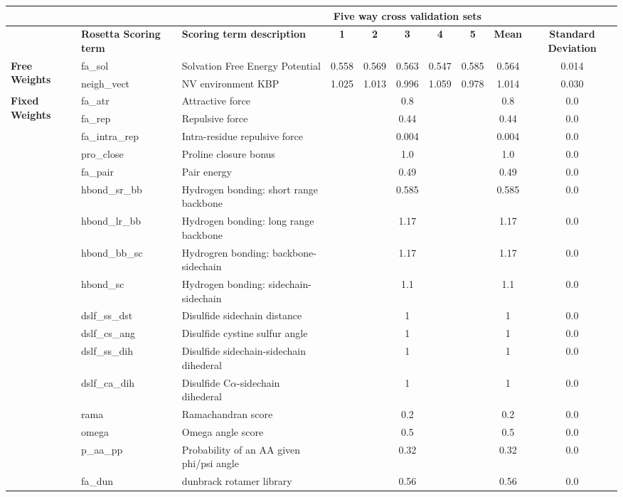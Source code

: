 
\begin{tabularx}{\textwidth}{|l||l|X|c|c|c|c|c|c|c|}
\hline
& & & \multicolumn{5}{c|}{\textbf{Five way cross validation sets}} & &  \\
\hline
& \textbf{Rosetta Scoring term} & \textbf{Scoring term description} & \textbf{1} & \textbf{2} & \textbf{3} & \textbf{4} & \textbf{5} & \textbf{Mean} & \textbf{Standard Deviation} \\
\hline
\hline
\multirow{2}{*}{\textbf{Free Weights}} & fa\_sol & Solvation Free Energy Potential & 0.558 & 0.569 & 0.563 & 0.547 & 0.585 & 0.564 & 0.014 \\
\cline{2-10}
& neigh\_vect & NV environment KBP & 1.025 & 1.013 & 0.996 & 1.059 & 0.978 & 1.014 & 0.030 \\
\hline
\multirow{17}{*}{\textbf{Fixed Weights}} & fa\_atr & Attractive force & \multicolumn{5}{c|}{0.8} & 0.8 & 0.0\\
\cline{2-10}
& fa\_rep & Repulsive force & \multicolumn{5}{c|}{0.44} & 0.44 & 0.0\\
\cline{2-10}
& fa\_intra\_rep & Intra-residue repulsive force & \multicolumn{5}{c|}{0.004} & 0.004 & 0.0\\
\cline{2-10}
& pro\_close & Proline closure bonus & \multicolumn{5}{c|}{1.0} & 1.0 & 0.0\\
\cline{2-10}
& fa\_pair & Pair energy & \multicolumn{5}{c|}{0.49} & 0.49 & 0.0\\
\cline{2-10}
& hbond\_sr\_bb & Hydrogen bonding: short range backbone & \multicolumn{5}{c|}{0.585} & 0.585 & 0.0\\
\cline{2-10}
& hbond\_lr\_bb & Hydrogen bonding: long range backbone & \multicolumn{5}{c|}{1.17} & 1.17 & 0.0\\
\cline{2-10}
& hbond\_bb\_sc & Hydrogren bonding: backbone-sidechain & \multicolumn{5}{c|}{1.17} & 1.17 & 0.0\\
\cline{2-10}
& hbond\_sc & Hydrogen bonding: sidechain-sidechain & \multicolumn{5}{c|}{1.1} & 1.1 & 0.0 \\
\cline{2-10}
& dslf\_ss\_dst & Disulfide sidechain distance & \multicolumn{5}{c|}{1} & 1 & 0.0\\
\cline{2-10}
& dslf\_cs\_ang & Disulfide cystine sulfur angle & \multicolumn{5}{c|}{1} & 1 & 0.0\\
\cline{2-10}
& dslf\_ss\_dih & Disulfide sidechain-sidechain dihederal & \multicolumn{5}{c|}{1} & 1 & 0.0\\
\cline{2-10}
& dslf\_ca\_dih & Disulfide C$\alpha$-sidechain dihederal & \multicolumn{5}{c|}{1} & 1 & 0.0\\
\cline{2-10}
& rama & Ramachandran score & \multicolumn{5}{c|}{0.2} & 0.2 & 0.0\\
\cline{2-10}
& omega & Omega angle score & \multicolumn{5}{c|}{0.5} & 0.5 & 0.0\\
\cline{2-10}
& p\_aa\_pp & Probability of an AA given phi/psi angle & \multicolumn{5}{c|}{0.32} & 0.32 & 0.0 \\
\cline{2-10}
& fa\_dun & dunbrack rotamer library & \multicolumn{5}{c|}{0.56} & 0.56 & 0.0\\
\hline
\end{tabularx}